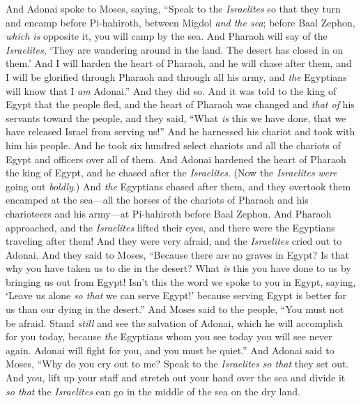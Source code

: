 \begin{biblechapter} %
 And Adonai spoke to Moses, saying,
\verse “Speak to the \textit{Israelites} so that they turn and encamp before Pi-hahiroth, between Migdol \textit{and the sea}; before Baal Zephon, \textit{which is} opposite it, you will camp by the sea.
\verse And Pharaoh will say of the \textit{Israelites}, ‘They are wandering around in the land. The desert has closed in on them.’
\verse And I will harden the heart of Pharaoh, and he will chase after them, and I will be glorified through Pharaoh and through all his army, and \textit{the} Egyptians will know that I \textit{am} Adonai.” And they did so.
\verse And it was told to the king of Egypt that the people fled, and the heart of Pharaoh was changed and \textit{that of} his servants toward the people, and they said, “What \textit{is} this we have done, that we have released Israel from serving us!”
\verse And he harnessed his chariot and took with him his people.
\verse And he took six hundred select chariots and all the chariots of Egypt and officers over all of them.
\verse And Adonai hardened the heart of Pharaoh the king of Egypt, and he chased after the \textit{Israelites}. (Now the \textit{Israelites} \textit{were} going out \textit{boldly}.)
\verse And \textit{the} Egyptians chased after them, and they overtook them encamped at the sea—all the horses of the chariots of Pharaoh and his charioteers and his army—at Pi-hahiroth before Baal Zephon.
\verse And Pharaoh approached, and the \textit{Israelites} lifted their eyes, and there were the Egyptians traveling after them! And they were very afraid, and the \textit{Israelites} cried out to Adonai.
\verse And they said to Moses, “Because there are no graves in Egypt? Is that why you have taken us to die in the desert? What \textit{is} this you have done to us by bringing us out from Egypt!
\verse Isn’t this the word we spoke to you in Egypt, saying, ‘Leave us alone \textit{so that} we can serve Egypt!’ because serving Egypt is better for us than our dying in the desert.”
\verse And Moses said to the people, “You must not be afraid. Stand \textit{still} and see the salvation of Adonai, which he will accomplish for you today, because \textit{the} Egyptians whom you see today you will see never again.
\verse Adonai will fight for you, and you must be quiet.”
\verse And Adonai said to Moses, “Why do you cry out to me? Speak to the \textit{Israelites} \textit{so that} they set out.
\verse And you, lift up your staff and stretch out your hand over the sea and divide it \textit{so that} the \textit{Israelites} can go in the middle of the sea on the dry land.

\end{biblechapter}

